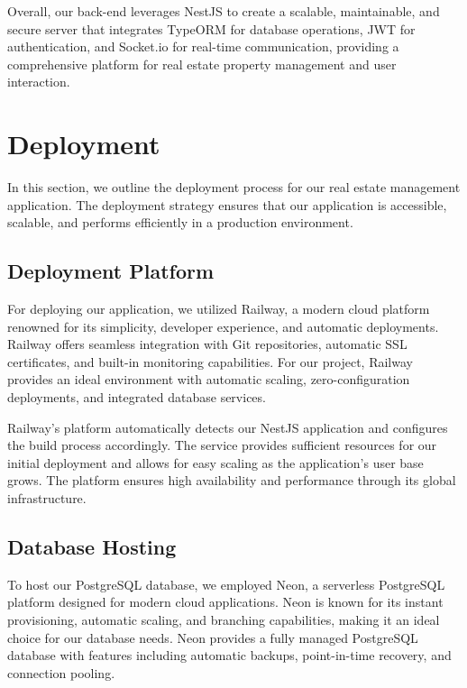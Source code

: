 Overall, our back-end leverages NestJS to create a scalable, maintainable, and secure server that integrates TypeORM for database operations, JWT for authentication, and Socket.io for real-time communication, providing a comprehensive platform for real estate property management and user interaction.

\newpage

\section{Deployment}

In this section, we outline the deployment process for our real estate management application. The deployment strategy ensures that our application is accessible, scalable, and performs efficiently in a production environment.

\subsection{Deployment Platform}

For deploying our application, we utilized Railway, a modern cloud platform renowned for its simplicity, developer experience, and automatic deployments. Railway offers seamless integration with Git repositories, automatic SSL certificates, and built-in monitoring capabilities. For our project, Railway provides an ideal environment with automatic scaling, zero-configuration deployments, and integrated database services.

Railway's platform automatically detects our NestJS application and configures the build process accordingly. The service provides sufficient resources for our initial deployment and allows for easy scaling as the application's user base grows. The platform ensures high availability and performance through its global infrastructure.

\subsection{Database Hosting}

To host our PostgreSQL database, we employed Neon, a serverless PostgreSQL platform designed for modern cloud applications. Neon is known for its instant provisioning, automatic scaling, and branching capabilities, making it an ideal choice for our database needs. Neon provides a fully managed PostgreSQL database with features including automatic backups, point-in-time recovery, and connection pooling.

